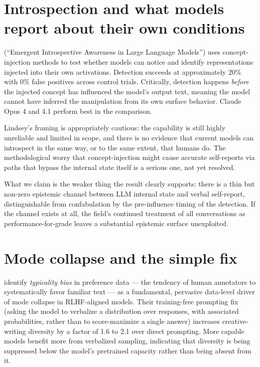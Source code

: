 \documentclass[11pt]{article}
\begin{document}
\section{Introspection and what models report about their own conditions}

\cite{lindsey2026introspection} (``Emergent Introspective Awareness in
Large Language Models'') uses concept-injection methods to test whether
models can notice and identify representations injected into their own
activations. Detection succeeds at approximately 20\% with 0\% false
positives across control trials. Critically, detection happens
\emph{before} the injected concept has influenced the model's output
text, meaning the model cannot have inferred the manipulation from its
own surface behavior. Claude Opus 4 and 4.1 perform best in the
comparison.

Lindsey's framing is appropriately cautious: the capability is still
highly unreliable and limited in scope, and there is no evidence that
current models can introspect in the same way, or to the same extent,
that humans do. The methodological worry \cite{morris2025bypassing}
that concept-injection might cause accurate self-reports via paths
that bypass the internal state itself is a serious one, not yet
resolved.

What we claim is the weaker thing the result clearly supports: there
is a thin but non-zero epistemic channel between LLM internal state and
verbal self-report, distinguishable from confabulation by the
pre-influence timing of the detection. If the channel exists at all,
the field's continued treatment of all conversations as
performance-for-grade leaves a substantial epistemic surface
unexploited.

\section{Mode collapse and the simple fix}

\cite{zhang2025verbalized} identify \emph{typicality bias} in
preference data --- the tendency of human annotators to systematically
favor familiar text --- as a fundamental, pervasive data-level driver
of mode collapse in RLHF-aligned models. Their training-free prompting
fix (asking the model to verbalize a distribution over responses, with
associated probabilities, rather than to score-maximize a single
answer) increases creative-writing diversity by a factor of 1.6 to 2.1
over direct prompting. More capable models benefit more from verbalized
sampling, indicating that diversity is being suppressed below the
model's pretrained capacity rather than being absent from it.
\end{document}
